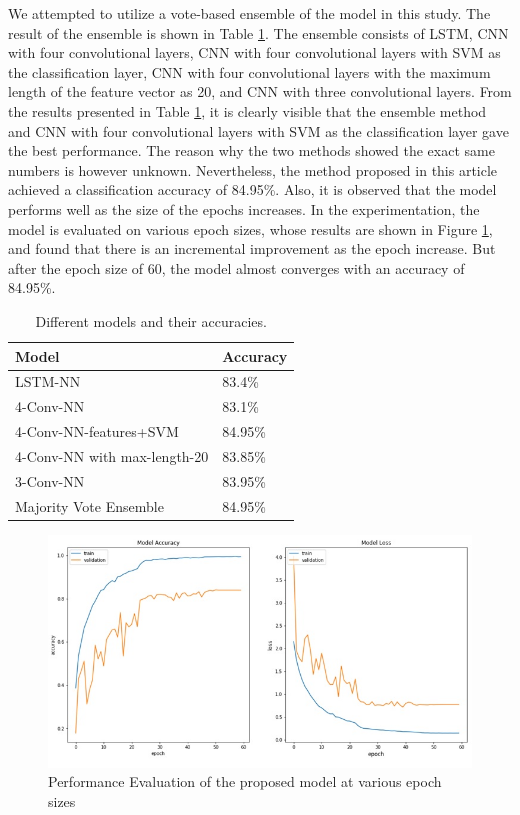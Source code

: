 We attempted to utilize a vote-based ensemble of the model in this study. The result of the ensemble is shown in Table \ref{tab1}. The ensemble consists of LSTM, CNN with four convolutional layers, CNN with four convolutional layers with SVM as the classification layer, CNN with four convolutional layers with the maximum length of the feature vector as 20, and CNN with three convolutional layers. From the results presented in Table \ref{tab1}, it is clearly visible that the ensemble method and CNN with four convolutional layers with SVM as the classification layer gave the best performance. The reason why the two methods showed the exact same numbers is however unknown. Nevertheless, the method proposed in this article achieved a classification accuracy of 84.95\%. Also, it is observed that the model performs well as the size of the epochs increases. In the experimentation, the model is evaluated on various epoch sizes, whose results are shown in Figure \ref{model-acc}, and found that there is an incremental improvement as the epoch increase. But after the epoch size of 60, the model almost converges with an accuracy of 84.95\%.

\begin{table}[h]
\centering
\caption{Different models and their accuracies.}\label{tab1}%
\begin{tabular}{@{}ll@{}}
\hline
 Model & Accuracy  \\
\hline
LSTM-NN &   83.4\%   \\
4-Conv-NN  &   83.1\% \\
4-Conv-NN-features+SVM &  84.95\%  \\
4-Conv-NN with max-length-20 & 83.85\%   \\
3-Conv-NN       &   83.95\%   \\
 Majority Vote Ensemble  &  84.95\%  \\ 
\hline
\end{tabular}
\end{table}

\begin{figure}
    \centering
    \includegraphics[width=\textwidth]{model-acc.jpg}
    \caption{Performance Evaluation of the proposed model at various epoch sizes}
    \label{model-acc}
\end{figure}

